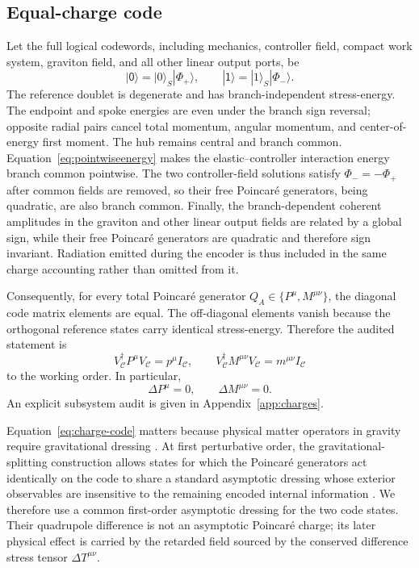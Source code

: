 \subsection{Equal-charge code}

Let the full logical codewords, including mechanics, controller field, compact work system, graviton field, and all other linear output ports, be
\begin{equation}
|\mathsf0\rangle=|0\rangle_S|\Phi_+\rangle,
\qquad
|\mathsf1\rangle=|1\rangle_S|\Phi_-\rangle.
\end{equation}
The reference doublet is degenerate and has branch-independent stress-energy. The endpoint and spoke energies are even under the branch sign reversal; opposite radial pairs cancel total momentum, angular momentum, and center-of-energy first moment. The hub remains central and branch common. Equation~\eqref{eq:pointwiseenergy} makes the elastic--controller interaction energy branch common pointwise. The two controller-field solutions satisfy $\Phi_-=-\Phi_+$ after common fields are removed, so their free Poincar\'e generators, being quadratic, are also branch common. Finally, the branch-dependent coherent amplitudes in the graviton and other linear output fields are related by a global sign, while their free Poincar\'e generators are quadratic and therefore sign invariant. Radiation emitted during the encoder is thus included in the same charge accounting rather than omitted from it.

Consequently, for every total Poincar\'e generator $Q_A\in\{P^\mu,M^{\mu\nu}\}$, the diagonal code matrix elements are equal. The off-diagonal elements vanish because the orthogonal reference states carry identical stress-energy. Therefore the audited statement is
\begin{equation}
\boxed{
V_{\mathcal C}^\dagger P^\mu V_{\mathcal C}=p^\mu I_{\mathcal C},
\qquad
V_{\mathcal C}^\dagger M^{\mu\nu}V_{\mathcal C}=m^{\mu\nu}I_{\mathcal C}}
\label{eq:charge-code}
\end{equation}
to the working order. In particular,
\begin{equation}
\Delta P^\mu=0,
\qquad
\Delta M^{\mu\nu}=0.
\end{equation}
An explicit subsystem audit is given in Appendix~\ref{app:charges}.

Equation~\eqref{eq:charge-code} matters because physical matter operators in gravity require gravitational dressing \cite{DonnellyGiddings2016}. At first perturbative order, the gravitational-splitting construction allows states for which the Poincar\'e generators act identically on the code to share a standard asymptotic dressing whose exterior observables are insensitive to the remaining encoded internal information \cite{DonnellyGiddings2018}. We therefore use a common first-order asymptotic dressing for the two code states. Their quadrupole difference is not an asymptotic Poincar\'e charge; its later physical effect is carried by the retarded field sourced by the conserved difference stress tensor $\Delta T^{\mu\nu}$.

